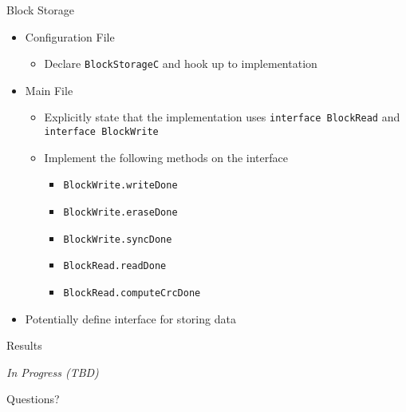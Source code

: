 \begin{frame}[t,fragile]{Block Storage}
\begin{itemize}
\item<1-> Configuration File
\begin{itemize}
\item<1-> Declare \texttt{BlockStorageC} and hook up to implementation
\end{itemize}
\item<2-> Main File
\begin{itemize}
\item<2-> Explicitly state that the implementation uses \texttt{interface BlockRead} and \texttt{interface BlockWrite}
\item<2-> Implement the following methods on the interface
\begin{itemize}
\item<2-> \texttt{BlockWrite.writeDone}
\item<2-> \texttt{BlockWrite.eraseDone}
\item<2-> \texttt{BlockWrite.syncDone}
\item<2-> \texttt{BlockRead.readDone}
\item<2-> \texttt{BlockRead.computeCrcDone}
\end{itemize}
\end{itemize}
\item<3-> Potentially define interface for storing data
\end{itemize}
\end{frame}

\begin{frame}[t,fragile]{Results}
\vfill
\vspace{1em}
\begin{center}
\pause
{\Large \textit{In Progress (TBD)}}
\end{center}
\vfill
\end{frame}

\begin{frame}[t,fragile]{}
\vfill
\vspace{3em}
\begin{center}
{\Huge Questions?}
\end{center}
\vfill
\end{frame}
